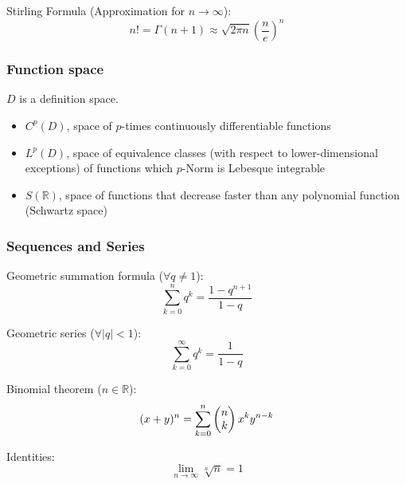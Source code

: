			\noindent
			Stirling Formula (Approximation for $n\rightarrow\infty$):
			\begin{equation}
				n! = \Gamma(n+1) \approx \sqrt{2\pi n} \left( \frac{n}{e} \right)^{n}
			\end{equation}


		\subsubsection{Function space}
			\noindent
			$D$ is a definition space.
			\begin{itemize}
				\item $C^p(D)$, space of $p$-times continuously differentiable functions
				\item $L^p(D)$, space of equivalence classes (with respect to lower-dimensional exceptions) of functions which $p$-Norm is Lebesque integrable
				\item $S(\mathbb{R})$, space of functions that decrease faster than any polynomial function (Schwartz space)
			\end{itemize}

		\subsubsection{Sequences and Series}
			\noindent
			Geometric summation formula ($\forall q \ne 1$):
			\begin{equation}
				\sum_{k=0}^n q^k=\frac{1-q^{n+1}}{1-q}
			\end{equation}

			\noindent
			Geometric series ($\forall \left|q\right| < 1$):
			\begin{equation}
				\sum_{k=0}^\infty q^k= \frac{1}{1-q}
			\end{equation}

			\noindent
			Binomial theorem ($n\in\mathbb{R}$):
			\begin{equation}
				(x+y)^n=\sum_{k=0}^{n}\left(\begin{matrix}n\\k\end{matrix}\right)x^k y^{n-k}
			\end{equation}

			\noindent
			Identities:
			\begin{equation}
				\lim_{n\rightarrow\infty} \sqrt[n]{n} = 1
			\end{equation}


